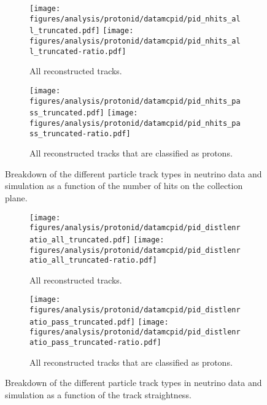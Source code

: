     \begin{figure}[h]
      \centering
      \begin{subfigure}[t]{2.5in}
        \texttt{[image: figures/analysis/protonid/datamcpid/pid\_nhits\_all\_truncated.pdf]}
        \texttt{[image: figures/analysis/protonid/datamcpid/pid\_nhits\_all\_truncated-ratio.pdf]}
        \caption{All reconstructed tracks.}
      \end{subfigure}
      \hspace{2pt}
      \begin{subfigure}[t]{2.5in}
        \texttt{[image: figures/analysis/protonid/datamcpid/pid\_nhits\_pass\_truncated.pdf]}
        \texttt{[image: figures/analysis/protonid/datamcpid/pid\_nhits\_pass\_truncated-ratio.pdf]}
        \caption{All reconstructed tracks that are classified as protons.}
      \end{subfigure}
      \caption{Breakdown of the different particle track types in neutrino data
      and simulation as a function of the number of hits on the collection
      plane.}
      \label{fig:pidnhits}
    \end{figure}
    \begin{figure}[h]
      \centering
      \begin{subfigure}[t]{2.5in}
        \texttt{[image: figures/analysis/protonid/datamcpid/pid\_distlenratio\_all\_truncated.pdf]}
        \texttt{[image: figures/analysis/protonid/datamcpid/pid\_distlenratio\_all\_truncated-ratio.pdf]}
        \caption{All reconstructed tracks.}
      \end{subfigure}
      \hspace{2pt}
      \begin{subfigure}[t]{2.5in}
        \texttt{[image: figures/analysis/protonid/datamcpid/pid\_distlenratio\_pass\_truncated.pdf]}
        \texttt{[image: figures/analysis/protonid/datamcpid/pid\_distlenratio\_pass\_truncated-ratio.pdf]}
        \caption{All reconstructed tracks that are classified as protons.}
      \end{subfigure}
      \caption{Breakdown of the different particle track types in neutrino data
      and simulation as a function of the track straightness.}
      \label{fig:piddistlenratio}
    \end{figure}
